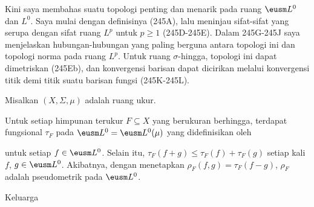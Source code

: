   
\def\halfarrow{\rightharpoonup}

\loadeusm

\def\chaptername{Ruang fungsi} \def\sectionname{Konvergensi dalam ukuran}


Kini saya membahas suatu topologi penting dan menarik pada ruang
$\eusm L^0$ dan $L^0$. Saya mulai dengan definisinya (245A), lalu meninjau
sifat-sifat yang serupa dengan sifat ruang $L^p$ untuk $p\ge 1$ (245D-245E).
Dalam 245G-245J saya menjelaskan hubungan-hubungan yang paling berguna antara
topologi ini dan topologi norma pada ruang $L^p$. Untuk ruang
$\sigma$-hingga, topologi ini dapat dimetriskan (245Eb), dan konvergensi
barisan dapat dicirikan melalui konvergensi titik demi titik suatu barisan
fungsi (245K-245L).

 Misalkan $(X,\Sigma,\mu)$ adalah ruang ukur.

 Untuk setiap himpunan terukur $F\subseteq X$ yang
berukuran berhingga, terdapat fungsional $\tau_F$ pada
$\eusm L^0=\eusm L^0(\mu)$ yang didefinisikan oleh


\noindent untuk setiap $f\in\eusm L^0$.  Selain itu,
$\tau_F(f+g)\le\tau_F(f)+\tau_F(g)$ setiap kali $f$, $g\in\eusm L^0$.
 Akibatnya, dengan menetapkan $\rho_F(f,g)=\tau_F(f-g)$, $\rho_F$ adalah
pseudometrik pada $\eusm L^0$.

 Keluarga

